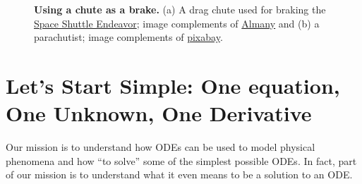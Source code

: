 \begin{figure}[htb]%
\centering
{}%
\hspace*{1cm}
%
\hfill%
    \caption[]{\textbf{Using a chute as a brake.} (a) A drag chute used for braking the \href{https://www.youtube.com/shorts/RwuI88iHeFo?t=33&feature=share}{Space Shuttle Endeavor}; image complements of \href{https://www.alamy.com/stock-photo/drag-chute-deployed.html?sortBy=relevant}{Almany} and (b) a parachutist; image complements of \href{https://pixabay.com/vectors/skydiver-fun-hippo-skydiving-151230/}{pixabay}.}
    \label{fig:DragParaChutes}
\end{figure}


\section{Let's Start Simple: One equation, One Unknown, One Derivative}

Our mission is to understand how ODEs can be used to model physical phenomena and how ``to solve'' some of the simplest possible ODEs. In fact, part of our mission is to understand what it even means to be a solution to an ODE.

